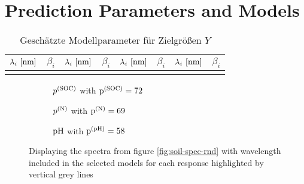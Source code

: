 \section{Prediction Parameters and Models}
\label{sec:parameters}

	\begin{table}[H]
		\center
		\caption{Geschätzte Modellparameter für Zielgrößen $Y$}
		\setlength{\extrarowheight}{1.9pt}
		\begin{tabular}{rr|rr|rr|rr}
			\hline
			$\lambda_i \ [\m{nm}]$ & $\beta_i$ & $\lambda_i \ [\m{nm}]$ & $\beta_i$ & $\lambda_i \ [\m{nm}]$ & $\beta_i$ & $\lambda_i \ [\m{nm}]$ & $\beta_i$ \\
			\hline
			\hline
%			
			\hline \\
		\end{tabular}
	\end{table}


	\begin{figure}[H]
		\begin{subfigure}[b]{\textwidth}
			\centering
			
			\caption{$p^{(\mathrm{SOC})}$ with $\mathrm{p}^{(\mathrm{SOC})} = 72$}
			\label{sfig:calib-soc}
		\end{subfigure}

		\begin{subfigure}[b]{\textwidth}
			\centering
			
			\caption{$p^{(\mathrm{N})}$ with $\mathrm{p}^{(\mathrm{N})} = 69$}
			\label{sfig:calib-n}
		\end{subfigure}

		\begin{subfigure}[b]{\textwidth}
			\centering
			
			\caption{$\mathrm{pH}$ with $\mathrm{p}^{(\mathrm{pH})} = 58$}
			\label{sfig:calib-ph}
		\end{subfigure}
		\caption{Displaying the spectra from figure \ref{fig:soil-spec-rnd} with wavelength included in the selected models for each response highlighted by vertical grey lines}
	\end{figure}

